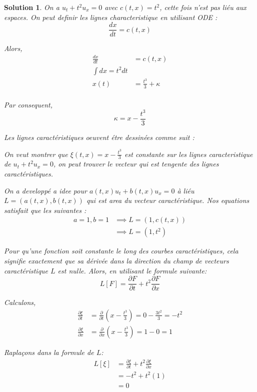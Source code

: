 \documentclass[10pt]{article}
\theoremstyle{frenchstyle}
\newtheorem{solution}{Solution}
\begin{document}
\begin{solution}
    On a $u_t + t^2u_x = 0$ avec $c(t,x)=t^2$, cette fois n'est pas liéu aux espaces. On peut definir les lignes characteristique en utilisant ODE : 
    \[
        \frac{dx}{dt}=c(t,x)
    \]

    Alors,
    \begin{align*}
        \frac{dx}{dt}&=c(t,x)\\
        \int dx = t^2dt\\
        x(t) &= \frac{t^3}{3} + \kappa\\
    \end{align*}

    Par consequent,
    \[
        \kappa = x - \frac{t^3}{3}
    \]

	Les lignes caractéristiques oeuvent étre dessinées comme suit :
	\begin{figure}[h]
		\centering
		
	\end{figure}

    On veut montrer que $\xi(t,x)=x-\frac{t^3}{3}$ est constante sur les lignes caracteristique de $u_t + t^2u_x=0$, on peut trouver le vecteur qui est tengente des lignes caractéristiques.

    On a developpé a idee pour $a(t,x)u_t + b(t,x)u_x=0$ à liéu $L=(a(t,x),b(t,x))$ qui est area du vecteur caractéristique. Nos equations satisfait que les suivantes : 
    \begin{align*}
        a=1, b=1 &\implies L = (1, c(t,x))\\
        &\implies L=(1, t^2)
    \end{align*}

    Pour qu'une fonction soit constante le long des courbes caractéristiques, cela signifie exactement que sa dérivée dans la direction du champ de vecteurs caractéristique $L$ est nulle. Alors, en utilisant le formule suivante:
    \[
        L[F]=\frac{\partial F}{\partial t} + t^2 \frac{\partial F}{\partial x}
    \]

    Calculons,
    \begin{align*}
        \frac{\partial \xi}{\partial t} &= \frac{\partial}{\partial t}\left(x - \frac{t^3}{3}\right) = 0 - \frac{3t^2}{3} = -t^2\\
        \frac{\partial \xi}{\partial x} &= \frac{\partial}{\partial x}\left(x - \frac{t^3}{3}\right)=1-0=1
    \end{align*}

    Raplaçons dans la formule de $L$:
    \begin{align*}
        L[\xi] &= \frac{\partial \xi}{\partial t} + t^2 \frac{\partial \xi}{\partial x}\\
        &= -t^2 + t^2(1)\\
        &= 0
    \end{align*}


\end{solution}
\end{document}
